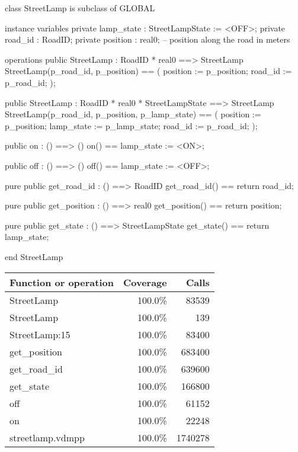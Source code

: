 \documentclass[a4paper]{article}
\begin{document}
\title{}
\author{}
\begin{vdm_al}
class StreetLamp is subclass of GLOBAL

instance variables
    private lamp_state : StreetLampState := <OFF>;
    private road_id : RoadID;
    private position : real0; -- position along the road in meters

operations
    public StreetLamp : RoadID * real0 ==> StreetLamp
    StreetLamp(p_road_id, p_position) == (
        position := p_position;
        road_id := p_road_id;
    );

    public StreetLamp : RoadID * real0 * StreetLampState ==> StreetLamp
    StreetLamp(p_road_id, p_position, p_lamp_state) == (
        position := p_position;
        lamp_state := p_lamp_state;
        road_id := p_road_id;
    );

    public on : () ==> ()
    on() == lamp_state := <ON>;

    public off : () ==> ()
    off() == lamp_state := <OFF>;

    pure public get_road_id : () ==> RoadID
    get_road_id() == return road_id;

    pure public get_position : () ==> real0
    get_position() == return position;

    pure public get_state : () ==> StreetLampState
    get_state() == return lamp_state;

end StreetLamp
\end{vdm_al}
\bigskip
\begin{longtable}{|l|r|r|}
\hline
Function or operation & Coverage & Calls \\
\hline
\hline
StreetLamp & 100.0\% & 83539 \\
\hline
StreetLamp & 100.0\% & 139 \\
\hline
StreetLamp:15 & 100.0\% & 83400 \\
\hline
get\_position & 100.0\% & 683400 \\
\hline
get\_road\_id & 100.0\% & 639600 \\
\hline
get\_state & 100.0\% & 166800 \\
\hline
off & 100.0\% & 61152 \\
\hline
on & 100.0\% & 22248 \\
\hline
\hline
streetlamp.vdmpp & 100.0\% & 1740278 \\
\hline
\end{longtable}
\end{document}
